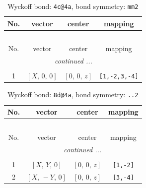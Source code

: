 \documentclass[fleqn,8pt]{jsarticle}
\begin{document}
\renewcommand{\arraystretch}{1.2}
\begin{longtable}{cccc}
\caption{Wyckoff bond: {\tt 4c@4a}, bond symmetry: {\tt mm2}}
 \\
 \hline \hline
No. & vector & center & mapping \\ \hline \endfirsthead

\multicolumn{3}{l}{\tablename\ \thetable{}} \\
 \hline \hline
No. & vector & center & mapping \\ \hline \endhead

 \hline \hline
\multicolumn{3}{r}{\footnotesize\it continued ...} \\ \endfoot

 \hline \hline
\multicolumn{3}{r}{} \\ \endlastfoot

1 & $\left[ X,\, 0,\, 0 \right]$ & $\left[ 0,\, 0,\, z \right]$ & {\tt [1,-2,3,-4]} \\
\end{longtable}
\renewcommand{\arraystretch}{1.2}
\begin{longtable}{cccc}
\caption{Wyckoff bond: {\tt 8d@4a}, bond symmetry: {\tt ..2}}
 \\
 \hline \hline
No. & vector & center & mapping \\ \hline \endfirsthead

\multicolumn{3}{l}{\tablename\ \thetable{}} \\
 \hline \hline
No. & vector & center & mapping \\ \hline \endhead

 \hline \hline
\multicolumn{3}{r}{\footnotesize\it continued ...} \\ \endfoot

 \hline \hline
\multicolumn{3}{r}{} \\ \endlastfoot

1 & $\left[ X,\, Y,\, 0 \right]$ & $\left[ 0,\, 0,\, z \right]$ & {\tt [1,-2]} \\ \hline
2 & $\left[ X,\, - Y,\, 0 \right]$ & $\left[ 0,\, 0,\, z \right]$ & {\tt [3,-4]} \\
\end{longtable}
\renewcommand{\arraystretch}{1.2}
\end{document}
